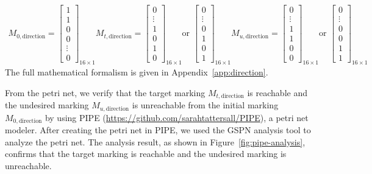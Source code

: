 \documentclass[12pt,a4paper]{article}
\begin{document}
\begin{align*}
    M_{0, \text{direction}} = \begin{bmatrix}
        1 \\ 1 \\ 0 \\ 0 \\ \vdots \\ 0
    \end{bmatrix}_{16 \times 1}
    M_{t, \text{direction}} = \begin{bmatrix}
        0 \\ \vdots \\ 1 \\ 0 \\ 1 \\ 0
    \end{bmatrix}_{16 \times 1} \text{or } 
    \begin{bmatrix}
        0 \\ \vdots \\ 0 \\ 1 \\ 0 \\ 1
    \end{bmatrix}_{16 \times 1}
    M_{u, \text{direction}} = \begin{bmatrix}
        0 \\ \vdots \\ 1 \\ 1 \\ 0 \\ 0
    \end{bmatrix}_{16 \times 1} \text{or } 
    \begin{bmatrix}
        0 \\ \vdots \\ 0 \\ 0 \\ 1 \\ 1
    \end{bmatrix}_{16 \times 1}
\end{align*}
The full mathematical formalism is given in Appendix~\ref{app:direction}.

From the petri net, we verify that the target marking $M_{t, \text{direction}}$ is reachable and the undesired marking $M_{u, \text{direction}}$ is unreachable from the initial marking $M_{0, \text{direction}}$ by using PIPE (\url{https://github.com/sarahtattersall/PIPE}), a petri net modeler. After creating the petri net in PIPE, we used the GSPN analysis tool to analyze the petri net. The analysis result, as shown in Figure~\ref{fig:pipe-analysis}, confirms that the target marking is reachable and the undesired marking is unreachable. 
\end{document}

